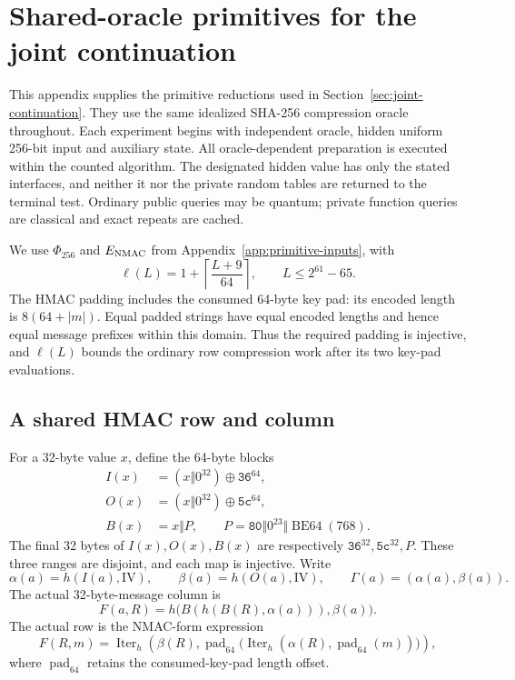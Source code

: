 \section{Shared-oracle primitives for the joint continuation}
\label{app:joint-primitives}

This appendix supplies the primitive reductions used in
Section~\ref{sec:joint-continuation}. They use the same idealized SHA-256
compression oracle throughout. Each experiment begins with independent
oracle, hidden uniform 256-bit input and auxiliary state. All
oracle-dependent preparation is executed within the counted algorithm.
The designated hidden value has only the stated interfaces, and neither
it nor the private random tables are returned to the terminal test.
Ordinary public queries may be quantum; private function queries are
classical and exact repeats are cached.

We use $\Phi_{256}$ and $E_{\rm NMAC}$ from
Appendix~\ref{app:primitive-inputs}, with
\[
 \ell(L)=1+\left\lceil\frac{L+9}{64}\right\rceil,
 \qquad L\le 2^{61}-65.
\]
The HMAC padding includes the consumed 64-byte key pad: its encoded
length is $8(64+|m|)$. Equal padded strings have equal encoded lengths
and hence equal message prefixes within this domain. Thus the required
padding is injective, and $\ell(L)$ bounds the ordinary row compression
work after its two key-pad evaluations.

\subsection{A shared HMAC row and column}
\label{app:joint-row-column}

For a 32-byte value $x$, define the 64-byte blocks
\[
 \begin{split}
 I(x)&=(x\Vert0^{32})\oplus\mathtt{36}^{64},\\
 O(x)&=(x\Vert0^{32})\oplus\mathtt{5c}^{64},\\
 B(x)&=x\Vert P,\qquad
 P=\mathtt{80}\Vert0^{23}\Vert\operatorname{BE64}(768).
 \end{split}
\]
The final 32 bytes of $I(x),O(x),B(x)$ are respectively
$\mathtt{36}^{32},\mathtt{5c}^{32},P$. These three ranges are disjoint,
and each map is injective. Write
\[
 \alpha(a)=h(I(a),\mathrm{IV}),\qquad
 \beta(a)=h(O(a),\mathrm{IV}),\qquad
 \Gamma(a)=(\alpha(a),\beta(a)).
\]
The actual 32-byte-message column is
\begin{equation}
 F(a,R)=h\bigl(B(h(B(R),\alpha(a))),\beta(a)\bigr).
 \label{eq:appendix-column-compression}
\end{equation}
The actual row is the NMAC-form expression
\[
 F(R,m)=\operatorname{Iter}_h\!\left(
 \beta(R),\operatorname{pad}_{64}
 \bigl(\operatorname{Iter}_h(\alpha(R),\operatorname{pad}_{64}(m))\bigr)
 \right),
\]
where $\operatorname{pad}_{64}$ retains the consumed-key-pad length offset.

